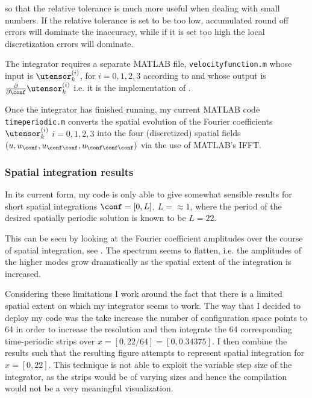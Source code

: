 so that the relative tolerance is much more useful when dealing with small numbers. If the
 relative tolerance is set to be too low, accumulated round off errors will dominate the
 inaccuracy, while if it is set too high the local discretization errors will dominate.

The integrator requires a separate MATLAB file, \texttt{velocityfunction.m} whose
input is $\utensor^{(i)}_{k}$, for $i = 0,1,2,3$ according to  and whose
 output is $\frac{\partial}{\partial \conf}\utensor^{(i)}_{k}$ i.e. it is the implementation of .

Once the integrator has finished running, my current MATLAB code
\\
\texttt{timeperiodic.m} converts the spatial evolution of the Fourier
coefficients $\utensor_k^{(i)}$ $i = 0,1,2,3$ into the four (discretized)
spatial fields $(u,
u_\conf, u_{\conf \conf}, u_{\conf \conf \conf})$ via the use of
MATLAB's IFFT.

\subsubsection{Spatial integration results}
In its current form, my code is only able to give somewhat sensible
results for short spatial integrations $\conf = [0, L]$, $L = \approx 1$,
where the period of the desired spatially periodic solution is known to
be $L=22$.

This can be seen by looking at the Fourier coefficient amplitudes over
the course of spatial integration, see . The spectrum
seems to flatten, i.e. the amplitudes of the higher modes grow
dramatically as the spatial extent of the integration is increased.

Considering these limitations I work around the fact that there is a
limited spatial extent on which my integrator seems to work. The way that
I decided to deploy my code was the take increase the number of
configuration space points to 64 in order to increase the resolution and
then integrate the 64 corresponding time-periodic strips over $x = [0,
22/64] = [0, 0.34375]$. I then combine the results such that the
resulting figure attempts to represent spatial integration for $x =
[0,22]$. This technique is not able to exploit the variable step size of
the integrator, as the strips would be of varying sizes and hence the
compilation would not be a very meaningful visualization.

